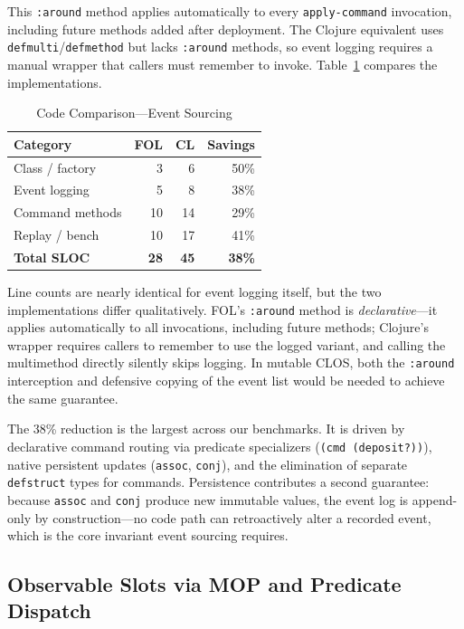 \documentclass[sigconf,nonacm,review]{acmart}
\begin{document}
This \texttt{:around} method applies automatically to every \texttt{apply-command} invocation, including future methods added after deployment. The Clojure equivalent uses \texttt{defmulti}/\texttt{defmethod} but lacks \texttt{:around} methods, so event logging requires a manual wrapper that callers must remember to invoke. Table~\ref{tab:eventsourcing} compares the implementations.

\begin{table}[htbp]
\caption{Code Comparison---Event Sourcing}
\label{tab:eventsourcing}
\small
\begin{tabular}{lrrr}
\toprule
\textbf{Category} & \textbf{FOL} & \textbf{CL} & \textbf{Savings} \\
\midrule
Class / factory & 3 & 6 & 50\% \\
Event logging & 5 & 8 & 38\% \\
Command methods & 10 & 14 & 29\% \\
Replay / bench & 10 & 17 & 41\% \\
\textbf{Total SLOC} & \textbf{28} & \textbf{45} & \textbf{38\%} \\
\bottomrule
\end{tabular}
\end{table}

Line counts are nearly identical for event logging itself, but the two implementations differ qualitatively. FOL's \texttt{:around} method is \textit{declarative}---it applies automatically to all invocations, including future methods; Clojure's wrapper requires callers to remember to use the logged variant, and calling the multimethod directly silently skips logging. In mutable CLOS, both the \texttt{:around} interception and defensive copying of the event list would be needed to achieve the same guarantee.

The 38\% reduction is the largest across our benchmarks. It is driven by declarative command routing via predicate specializers (\texttt{(cmd (deposit?))}), native persistent updates (\texttt{assoc}, \texttt{conj}), and the elimination of separate \texttt{defstruct} types for commands. Persistence contributes a second guarantee: because \texttt{assoc} and \texttt{conj} produce new immutable values, the event log is append-only by construction---no code path can retroactively alter a recorded event, which is the core invariant event sourcing requires.

\subsection{Observable Slots via MOP and Predicate Dispatch}
\end{document}
